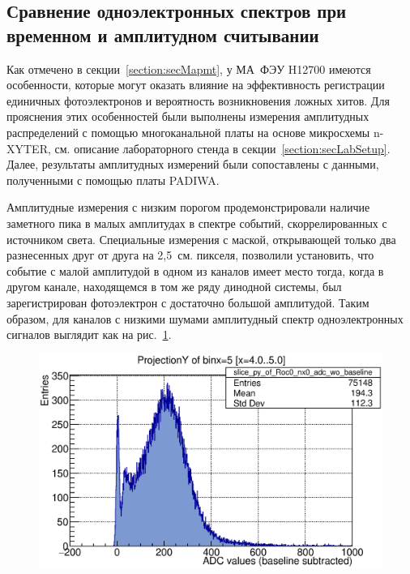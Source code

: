\subsection{Сравнение одноэлектронных спектров при временном и амплитудном считывании}\label{section:secNxVsPadiwa}

Как отмечено в секции~\ref{section:secMapmt}, у МА~ФЭУ H12700 имеются особенности, которые могут оказать влияние на эффективность регистрации единичных фотоэлектронов и вероятность возникновения ложных хитов. Для прояснения этих особенностей были выполнены измерения амплитудных распределений с помощью многоканальной платы на основе микросхемы n-XYTER, см. описание лабораторного стенда в секции~\ref{section:secLabSetup}. Далее, результаты амплитудных измерений были сопоставлены с данными, полученными с помощью платы PADIWA.

Амплитудные измерения с низким порогом продемонстрировали наличие заметного пика в малых амплитудах в спектре событий, скоррелированных с источником света.
Специальные измерения с маской, открывающей только два разнесенных друг от друга на 2,5~см. пикселя, позволили установить, что событие с малой амплитудой в одном из каналов имеет место тогда, когда в другом канале, находящемся в том же ряду динодной системы, был зарегистрирован фотоэлектрон с достаточно большой амплитудой. Таким образом, для каналов с низкими шумами амплитудный спектр одноэлектронных сигналов выглядит как на рис.~\ref{fig:PeculiarSpectrum}.

\begin{figure}
\includegraphics[width=1.0\textwidth]{pictures/PeculiarSpectrum.eps}
\caption{}
\label{fig:PeculiarSpectrum}
\end{figure}

